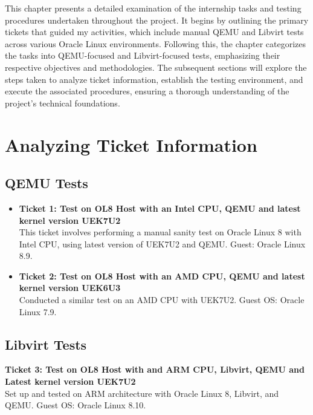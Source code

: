 This chapter presents a detailed examination of the internship tasks and testing procedures undertaken throughout the project. It begins by outlining the primary tickets that guided my activities, which include manual QEMU and Libvirt tests across various Oracle Linux environments. Following this, the chapter categorizes the tasks into QEMU-focused and Libvirt-focused tests, emphasizing their respective objectives and methodologies. The subsequent sections will explore the steps taken to analyze ticket information, establish the testing environment, and execute the associated procedures, ensuring a thorough understanding of the project's technical foundations.


\newpage
{}
\hypertarget{thirdchapter}{}

\section{Analyzing Ticket Information}

\subsection{QEMU Tests}
\begin{itemize}
    \item \textbf{Ticket 1: Test on OL8 Host with an Intel CPU, QEMU and latest kernel version UEK7U2} \\
          This ticket involves performing a manual sanity test on Oracle Linux 8 with Intel CPU, using latest version of UEK7U2 and QEMU. Guest: Oracle Linux 8.9.
    \item \textbf{Ticket 2: Test on OL8 Host with an AMD CPU, QEMU and latest kernel version UEK6U3} \\
          Conducted a similar test on an AMD CPU with UEK7U2. Guest OS: Oracle Linux 7.9.
\end{itemize}

\subsection{Libvirt Tests}
\textbf{Ticket 3: Test on OL8 Host with and ARM CPU, Libvirt, QEMU and Latest kernel version UEK7U2} \\
Set up and tested on ARM architecture with Oracle Linux 8, Libvirt, and QEMU. Guest OS: Oracle Linux 8.10. \mynewline


